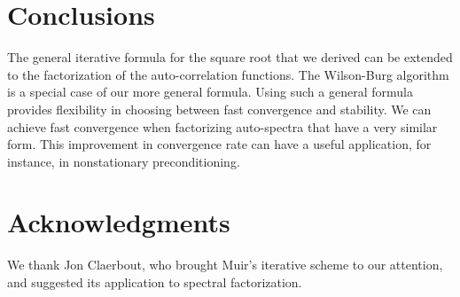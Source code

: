 \section{Conclusions}
The general iterative formula for the square root that we derived can
be extended to the factorization of the auto-correlation
functions. The Wilson-Burg algorithm is a special
case of our more general formula. Using such a general formula
provides flexibility in choosing between fast convergence and
stability. We can achieve fast convergence
when factorizing auto-spectra that have a very similar form.
This improvement in convergence rate can have a useful
application, for instance, in nonstationary preconditioning.

\section{Acknowledgments}
We thank Jon Claerbout, who brought Muir's iterative scheme to our
attention, and suggested its application to spectral factorization.




